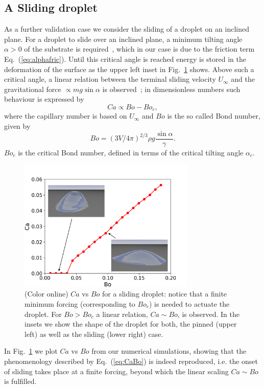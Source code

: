 \subsection{A Sliding droplet}
As a further validation case we consider the sliding of a droplet on an inclined plane.
For a droplet to slide over an inclined plane, a minimum tilting angle $\alpha >0$ of the substrate is required~\cite{Furmidge}, which in our case is due to the friction term Eq.~(\ref{eq:alphafric}). Until this critical angle is reached energy is stored in the deformation of the surface as the upper left inset in Fig.~\ref{fig:CaBo} shows. Above such a critical angle, a linear relation between the terminal sliding velocity $U_{\infty}$ and the gravitational force $\propto m g \sin \alpha$ is observed~\cite{Podgorski,Kim,Sbragaglia}; in dimensionless numbers such 
behaviour is expressed by 
\begin{equation}\label{eq:CaBo}
Ca \propto Bo - Bo_c,
\end{equation}
where the capillary number is based on $U_{\infty}$ and $Bo$ is the so called Bond number, given by
\begin{equation}
  Bo = (3V/4\pi)^{2/3}\rho g \frac{\sin\alpha}{\gamma}.
\end{equation}
$Bo_c$ is the critical Bond number, defined in terms of the critical 
tilting angle $\alpha_c$.
  \begin{figure}
    \centering
    \includegraphics[width=0.75\textwidth]{graphics/Fig_7_Ca_Bo_true_with_pic.png}
    \caption{(Color online) $Ca$ vs $Bo$ for a sliding droplet: notice that a finite minimum forcing (corresponding to $Bo_c$) is needed to actuate the droplet. For $Bo > Bo_c$ a linear relation, $Ca \sim Bo$, is observed. In the insets we show the shape of the droplet for both, the pinned (upper left) as well as the sliding (lower right) case.
    }
    \label{fig:CaBo}
\end{figure}
In Fig.~\ref{fig:CaBo} we plot $Ca$ vs $Bo$ from our numerical simulations, showing that the phenomenology described by Eq.~(\ref{eq:CaBo}) is 
indeed reproduced, i.e. the onset of sliding takes place at a finite 
forcing, beyond which the linear scaling $Ca \sim Bo$ is fulfilled. 

